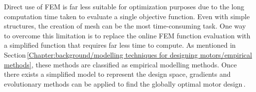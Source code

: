         
        Direct use of \acs{FEM} is far less suitable for optimization purposes due to the long computation time taken to evaluate a single objective function. Even with simple structures, the creation of mesh can be the most time-consuming task. One way to overcome this limitation is to replace the online \acs{FEM} function evaluation with a simplified function that requires far less time to compute. As mentioned in Section\,\ref{Chapter:background/modelling techniques for designing motors/empirical methods}, these methods are classified as empirical modelling methods. Once there exists a simplified model to represent the design space, gradients and evolutionary methods can be applied to find the globally optimal motor design\,\cite{Ashabani2010OptimumApproach,Lee2012OptimumMethod,Giurgea2007,Hasanien2010, Hasanien2011,Zhang2017}. 
